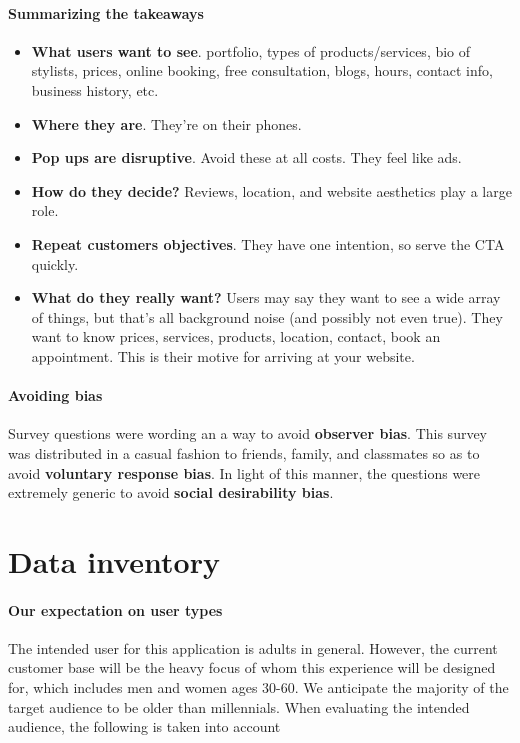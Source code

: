 \paragraph{Summarizing the takeaways}
\begin{itemize}
\item
  \textbf{What users want to see}. portfolio, types of products/services, bio of stylists, prices, online booking, free consultation, blogs, hours, contact info, business history, etc.
\item
  \textbf{Where they are}. They're on their phones.
\item
  \textbf{Pop ups are disruptive}. Avoid these at all costs. They feel like ads.
\item
  \textbf{How do they decide?} Reviews, location, and website aesthetics play a large role.
\item
  \textbf{Repeat customers objectives}. They have one intention, so serve the CTA quickly.
\item
  \textbf{What do they really want?} Users may say they want to see a wide array of things, but that's all background noise (and possibly not even true). They want to know prices, services, products, location, contact, book an appointment. This is their  motive for arriving at your website.
\end{itemize}

\paragraph{Avoiding bias}
Survey questions were wording an a way to avoid \textbf{observer bias}. This survey was distributed in a casual fashion to friends, family, and classmates so as to avoid \textbf{voluntary response bias}. In light of this manner, the questions were extremely generic to avoid \textbf{social desirability bias}.


\section{Data inventory}

\paragraph{Our expectation on user types}
The intended user for this application is adults in general. However, the current customer base will be the heavy focus of whom this experience will be designed for, which includes men and women ages 30-60. We anticipate the majority of the target audience to be older than millennials. When evaluating the intended audience, the following is taken into account

